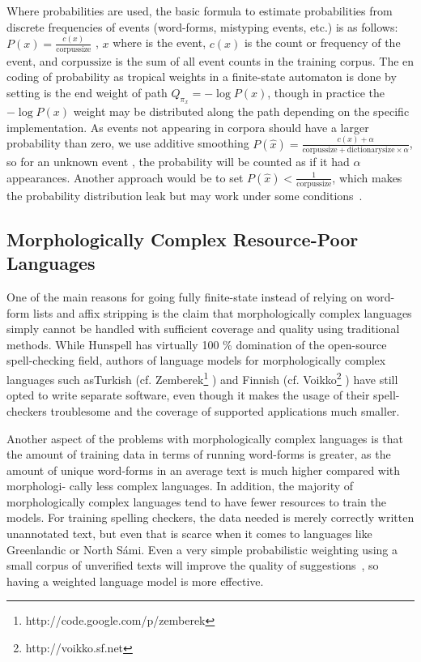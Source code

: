 \documentclass[postprint]{flammie}
\begin{document}
Where probabilities are used, the basic formula to estimate probabilities from
discrete frequencies of events (word-forms, mistyping events, etc.) is as
follows: $P(x) = \frac{c(x)}{\mathrm{corpus size}}$ , $x$ where is the event,
$c(x)$ is the count or frequency of the event, and $\mathrm{corpus size}$ is
the sum of all event counts in the training corpus. The en coding of
probability as tropical weights in a finite-state automaton is done by setting
is the end weight of path $Q_{\pi_x} = -\log P(x)$, though in practice the
$-\log P(x)$  weight may be distributed along the path depending on the
specific implementation.  As events not appearing in corpora should have a
larger probability than zero, we use additive smoothing $P(\hat x) = \frac{c(x)
+ \alpha}{\mathrm{corpus size} + \mathrm{dictionary size} \times \alpha}$, so
for an unknown event , the probability will be counted as if it had $\alpha$
appearances. Another approach would be to set $P(\hat x) <
\frac{1}{\mathrm{corpus size}}$, which makes the probability distribution leak
but may work under some conditions~\cite{brants2007large}.

\subsection{Morphologically Complex Resource-Poor Languages}

One of the main reasons for going fully finite-state instead of relying on
word-form lists and affix stripping is the claim that morphologically complex
languages simply cannot be handled with sufficient coverage and quality using
traditional methods.  While Hunspell has virtually 100 \% domination of the
open-source spell-checking field, authors of language models for
morphologically complex languages such asTurkish (cf.
Zemberek\footnote{http://code.google.com/p/zemberek} ) and Finnish (cf.
Voikko\footnote{http://voikko.sf.net} ) have still opted to write separate
software, even though it makes the usage of their spell-checkers troublesome
and the coverage of supported applications much smaller.

Another aspect of the problems with morphologically complex languages is that
the amount of training data in terms of running word-forms is greater, as the
amount of unique word-forms in an average text is much higher compared with
morphologi- cally less complex languages. In addition, the majority of
morphologically complex languages tend to have fewer resources to train the
models. For training spelling checkers, the data needed is merely correctly
written unannotated text, but even that is scarce when it comes to languages
like Greenlandic or North Sámi. Even a very simple probabilistic weighting
using a small corpus of unverified texts will improve the quality of
suggestions~\cite{pirinen2010creating}, so having a weighted language model is
more effective.
\end{document}
